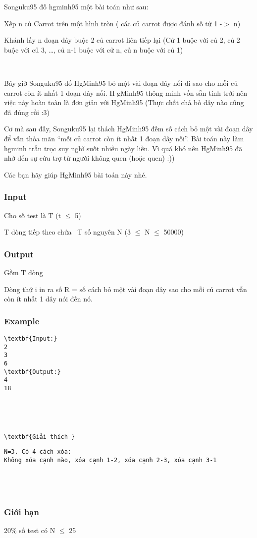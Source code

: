 

Songuku95 đố hgminh95 một bài toán như sau:

Xếp n củ Carrot trên một hình tròn ( các củ carrot được đánh số từ 1 -$>$ n)

Khánh lấy n đoạn dây buộc 2 củ carrot liên tiếp lại (Cử 1 buộc với củ 2, củ 2 buộc với củ 3, …, củ n-1 buộc với cử n, củ n buộc với củ 1)

 

Bây giờ Songuku95 đố HgMinh95 bỏ một vài đoạn dây nối đi sao cho mỗi củ carrot còn ít nhất 1 đoạn dây nối. H gMinh95 thông minh vốn sẵn tính trời nên việc này hoàn toàn là đơn giản với HgMinh95 (Thực chất chả bỏ dây nào cũng đã đúng rồi :3)

Cơ mà sau đấy, Songuku95 lại thách HgMinh95 đếm số cách bỏ một vài đoạn dây để vẫn thỏa mãn “mỗi củ carrot còn ít nhất 1 đoạn dây nối”. Bài toán này làm hgminh trằn trọc suy nghĩ suốt nhiều ngày liền. Vì quá khó nên HgMinh95 đã nhờ đến sự cứu trợ từ người không quen (hoặc quen) :))

Các bạn hãy giúp HgMinh95 bài toán này nhé.

\subsubsection{Input}

Cho số test là T (t  $\le$  5)

T dòng tiếp theo chứa  T số nguyên N (3  $\le$  N  $\le$  50000)

\subsubsection{Output}

Gồm T dòng

Dòng thứ i in ra số R = số cách bỏ một vài đoạn dây sao cho mỗi củ carrot vẫn còn ít nhất 1 dây nói đến nó.

\subsubsection{Example}
\begin{verbatim}
\textbf{Input:}
2
3
6
\textbf{Output:}  
4
18\end{verbatim}

 

 
\begin{verbatim}
\textbf{Giải thích }\end{verbatim}
\begin{verbatim}
N=3. Có 4 cách xóa:
Không xóa cạnh nào, xóa cạnh 1-2, xóa cạnh 2-3, xóa cạnh 3-1 \end{verbatim}
\begin{verbatim}
 \end{verbatim}
\begin{verbatim}
 \end{verbatim}

\subsubsection{Giới hạn}

20\% số test có N  $\le$  25  
